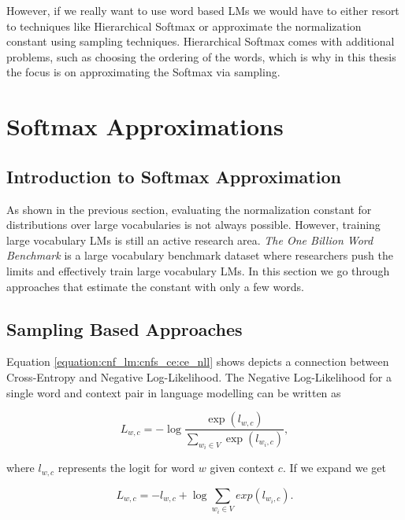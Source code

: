 However, if we really want to use word based LMs we would have to either resort to techniques like Hierarchical Softmax \citep{morin2005hierarchical} or approximate the normalization constant using sampling techniques. Hierarchical Softmax comes with additional problems, such as choosing the ordering of the words, which is why in this thesis the focus is on approximating the Softmax via sampling.

\section{Softmax Approximations}
\label{section:cnf_lm:softmax_approximations}
\subsection{Introduction to Softmax Approximation}

As shown in the previous section, evaluating the normalization constant for distributions over large vocabularies is not always possible. However, training large vocabulary LMs is still an active research area. \emph{The One Billion Word Benchmark} \citep{chelba2013one} is a large vocabulary benchmark dataset where researchers push the limits and effectively train large vocabulary LMs. In this section we go through approaches that estimate the constant with only a few words.

\subsection{Sampling Based Approaches}

Equation \ref{equation:cnf_lm:cnfs_ce:ce_nll} shows depicts a connection between Cross-Entropy and Negative Log-Likelihood. The Negative Log-Likelihood for a single word and context pair in language modelling can be written as

\begin{displaymath}
    L_{w, c} = - \log \frac{\exp(l_{w,c})}{\sum_{w_i \in V} \exp(l_{w_i,c})},
\end{displaymath}

where $ l_{w,c} $ represents the logit for word $ w $ given context $ c $. If we expand we get


\begin{displaymath}
    L_{w, c} = - l_{w, c} + \log \sum_{w_i \in V} exp(l_{w_i,c}).
\end{displaymath}

